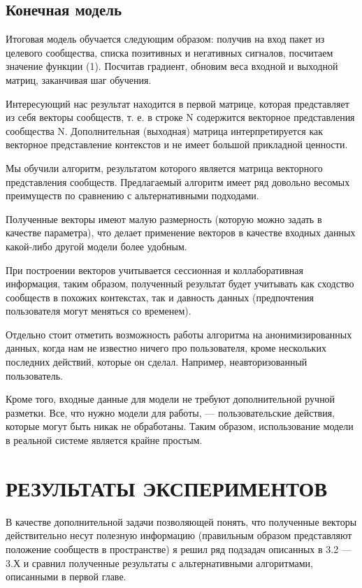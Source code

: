 \documentclass[times,specification,annotation]{itmo-student-thesis}
\begin{document}
\section{Конечная модель}

Итоговая модель обучается следующим образом: получив на вход пакет из
целевого сообщества, списка позитивных и негативных сигналов, посчитаем
значение функции (1). Посчитав градиент, обновим веса входной и выходной
матриц, заканчивая шаг обучения.

Интересующий нас результат находится в первой матрице, которая
представляет из себя векторы сообществ, т. е. в строке N содержится векторное
представления сообщества N. Дополнительная (выходная) матрица
интерпретируется как векторное представление контекстов и не имеет большой
прикладной ценности.

\chapterconclusion

Мы обучили алгоритм, результатом которого является матрица векторного
представления сообществ. Предлагаемый алгоритм имеет ряд довольно весомых
преимуществ по сравнению с альтернативными подходами. 

Полученные векторы
имеют малую размерность (которую можно задать в качестве параметра), что
делает применение векторов в качестве входных данных какой-либо другой
модели более удобным. 

При построении векторов учитывается сессионная и
коллаборативная информация, таким образом, полученный результат будет
учитывать как сходство сообществ в похожих контекстах, так и давность данных
(предпочтения пользователя могут меняться со временем). 

Отдельно стоит отметить возможность работы алгоритма на анонимизированных данных, когда
нам не известно ничего про пользователя, кроме нескольких последних действий,
которые он сделал. Например, неавторизованный пользователь.

Кроме того, входные данные для модели не требуют дополнительной ручной разметки. Все, что нужно модели для работы, --- пользовательские действия, которые могут быть никак не обработаны. Таким образом, использование модели в реальной системе является крайне простым.

\chapter{РЕЗУЛЬТАТЫ ЭКСПЕРИМЕНТОВ}

В качестве дополнительной задачи позволяющей понять, что полученные
векторы действительно несут полезную информацию (правильным образом
представляют положение сообществ в пространстве) я решил ряд подзадач
описанных в 3.2 --- 3.Х и сравнил полученные результаты с альтернативными
алгоритмами, описанными в первой главе.
\end{document}
